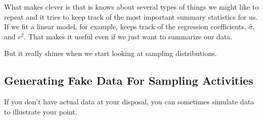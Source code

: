 What makes  clever is that is knows about several types of things
we might like to repeat and it tries to keep track of the most important summary 
statistics for us.  
If we fit a linear model, 
for example,   keeps track of the regression coefficients, 
$\hat \sigma$, and $r^2$.
That makes it useful even if we just want to summarize our data.
\begin{knitrout}
\end{knitrout}

But it really shines when we start looking at sampling distributions.
\begin{knitrout}
\end{knitrout}


\subsection{Generating Fake Data For Sampling Activities}
\label{sec:fake-families}%
If you don't have actual data at your disposal, you can sometimes simulate data
to illustrate your point.  

